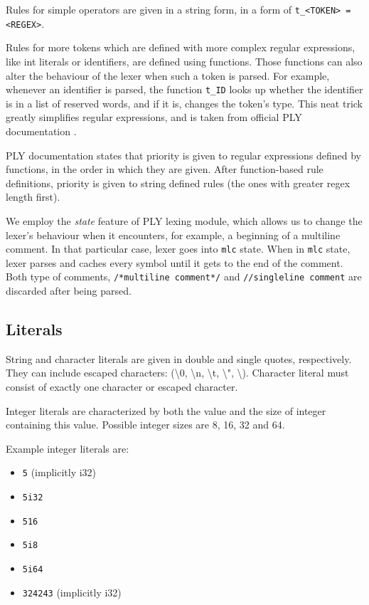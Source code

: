 \documentclass[times, utf8, diplomski]{fer}
\theoremstyle{definition}
\begin{document}
Rules for simple operators are given in a string form, 
in a form of \texttt{t\_<TOKEN> = <REGEX>}.

Rules for more tokens which are defined with more complex regular expressions, 
like int literals or identifiers, are defined using functions. 
Those functions can also alter the behaviour of the
lexer when such a token is parsed. For example, whenever an identifier is parsed,
the function \texttt{t\_ID} looks up whether the identifier is in a list of reserved
words, and if it is, changes the token's type. This neat trick greatly simplifies
regular expressions, and is taken from official PLY documentation \citep{c_ply_docs_beazley}.

PLY documentation states that priority is given to regular expressions defined by functions, 
in the order in which they are given.
After function-based rule definitions, 
priority is given to string defined rules (the ones with greater regex length first).

We employ the \textit{state} feature of PLY lexing module, 
which allows us to change the lexer's behaviour
when it encounters, for example, a beginning of a multiline comment. 
In that particular case, lexer goes into \texttt{mlc} state.
When in \texttt{mlc} state, lexer parses and caches every 
symbol until it gets to the end of the comment. 
Both type of comments, \texttt{/*multiline comment*/} and \texttt{//singleline comment} are discarded
after being parsed.

\subsection{Literals}

String and character literals are given in double and single quotes, respectively.
They can include escaped characters:  (\textbackslash 0, \textbackslash n, \textbackslash t, 
\textbackslash ", \textbackslash \textquotesingle). 
Character literal must consist of exactly one character or escaped character.

Integer literals are characterized by both the value and the size of integer containing this value.
Possible integer sizes are 8, 16, 32 and 64.

Example integer literals are:
\begin{itemize}
    \item \texttt{5} (implicitly i32)
    \item \texttt{5i32}
    \item \texttt{516}
    \item \texttt{5i8}
    \item \texttt{5i64}
    \item \texttt{324243} (implicitly i32)
\end{itemize}
\end{document}
